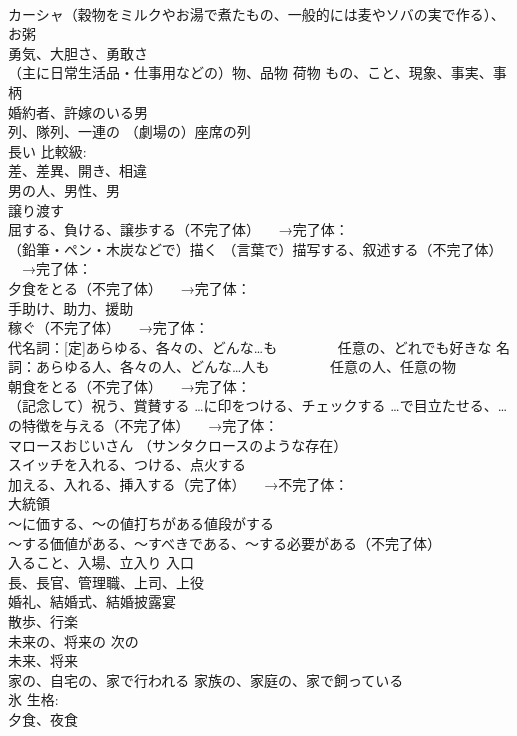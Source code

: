 \documentclass[8pt]{extreport}
\begin{document}
\begin{CJK}{UTF8}{min}
\\	カーシャ（穀物をミルクやお湯で煮たもの、一般的には麦やソバの実で作る）、お粥
\\	勇気、大胆さ、勇敢さ
\\	（主に日常生活品・仕事用などの）物、品物 荷物 もの、こと、現象、事実、事柄
\\	婚約者、許嫁のいる男
\\	列、隊列、一連の （劇場の）座席の列
\\	長い 比較級:
\\	差、差異、開き、相違
\\	男の人、男性、男
\\	譲り渡す 
\\	屈する、負ける、譲歩する（不完了体） 　→完了体：
\\	（鉛筆・ペン・木炭などで）描く （言葉で）描写する、叙述する（不完了体） 　→完了体：
\\	夕食をとる（不完了体） 　→完了体：
\\	手助け、助力、援助
\\	稼ぐ（不完了体） 　→完了体：
\\	代名詞：[定]あらゆる、各々の、どんな…も 　　　　任意の、どれでも好きな 名詞：あらゆる人、各々の人、どんな…人も 　　　　任意の人、任意の物
\\	朝食をとる（不完了体） 　→完了体：
\\	（記念して）祝う、賞賛する …に印をつける、チェックする …で目立たせる、…の特徴を与える（不完了体） 　→完了体：
\\	マロースおじいさん （サンタクロースのような存在）
\\	スイッチを入れる、つける、点火する 
\\	加える、入れる、挿入する（完了体） 　→不完了体：
\\	大統領
\\	～に価する、～の値打ちがある値段がする 
\\	[無人動]～する価値がある、～すべきである、～する必要がある（不完了体）
\\	入ること、入場、立入り 入口
\\	長、長官、管理職、上司、上役
\\	婚礼、結婚式、結婚披露宴
\\	散歩、行楽
\\	未来の、将来の 次の
\\	未来、将来
\\	家の、自宅の、家で行われる 家族の、家庭の、家で飼っている
\\	氷 生格:
\\	夕食、夜食

\end{CJK}
\end{document}
